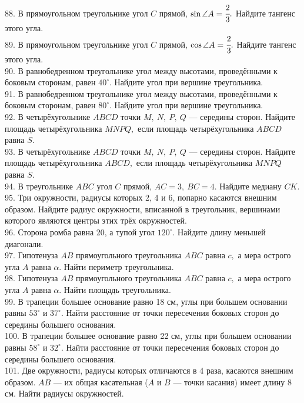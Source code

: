 88. В прямоугольном треугольнике угол $C$ прямой, $\sin \angle A=\cfrac{2}{3}.$ Найдите тангенс этого угла.\\
89. В прямоугольном треугольнике угол $C$ прямой, $\cos \angle A=\cfrac{2}{3}.$ Найдите тангенс этого угла.\\
90. В равнобедренном треугольнике угол между высотами, проведёнными к боковым сторонам, равен $40^\circ.$ Найдите угол при вершине треугольника.\\
91. В равнобедренном треугольнике угол между высотами, проведёнными к боковым сторонам, равен $80^\circ.$ Найдите угол при вершине треугольника.\\
92. В четырёхугольнике $ABCD$ точки $M,\ N,\ P,\ Q$ --- середины сторон. Найдите площадь четырёхугольника $MNPQ,$ если площадь четырёхугольника $ABCD$ равна $S.$\\
93. В четырёхугольнике $ABCD$ точки $M,\ N,\ P,\ Q$ --- середины сторон. Найдите площадь четырёхугольника $ABCD,$ если площадь четырёхугольника $MNPQ$ равна $S.$\\
94. В треугольнике $ABC$ угол $C$ прямой, $AC=3,\ BC=4.$ Найдите медиану $CK.$\\
95. Три окружности, радиусы которых 2, 4 и 6, попарно касаются внешним образом. Найдите радиус окружности, вписанной в треугольник, вершинами которого являются центры этих трёх окружностей.\\
96. Сторона ромба равна 20, а тупой угол $120^\circ.$ Найдите длину меньшей диагонали.\\
97. Гипотенуза $AB$ прямоугольного треугольника $ABC$ равна $c,$ а мера острого угла $A$ равна $\alpha.$ Найти периметр треугольника.\\
98. Гипотенуза $AB$ прямоугольного треугольника $ABC$ равна $c,$ а мера острого угла $A$ равна $\alpha.$ Найти площадь треугольника.\\
99. В трапеции большее основание равно 18 см, углы при большем основании равны $53^\circ$ и $37^\circ.$ Найти расстояние от точки пересечения боковых сторон до середины большего основания.\\
100. В трапеции большее основание равно 22 см, углы при большем основании равны $58^\circ$ и $32^\circ.$ Найти расстояние от точки пересечения боковых сторон до середины большего основания.\\
101. Две окружности, радиусы которых отличаются в 4 раза, касаются внешним образом. $AB$ --- их общая касательная ($A$ и $B$ --- точки касания) имеет длину 8 см. Найти радиусы окружностей.\\
